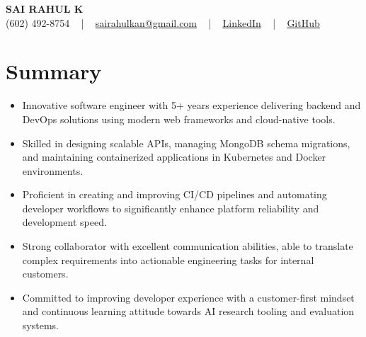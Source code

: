 \documentclass[letterpaper,11pt]{article}
\newcommand{\resumeItem}[1]{
  \item\footnotesize{
    {#1 \vspace{-2pt}}
  }
}
\newcommand{\resumeItemListStart}{\begin{itemize}[leftmargin=*]}
\newcommand{\resumeItemListEnd}{\end{itemize}\vspace{-5pt}}
\begin{document}
\begin{center}
    {\fontsize{14pt}{12pt}\selectfont \textbf{\MakeUppercase{Sai Rahul K}}}\\ \vspace{2pt}
    \fontsize{10pt}{12pt}\selectfont (602) 492-8754 ~ | ~ \href{mailto:sairahulkan@gmail.com}{sairahulkan@gmail.com} ~ | ~
    \href{https://www.linkedin.com/in/rq123/}{\color{blue}\underline{LinkedIn}} ~ | ~
    \href{https://github.com/kanrahuldo}{\color{blue}\underline{GitHub}}~
    \vspace{-8pt}
\end{center}

\section{Summary}
\fontsize{9pt}{10pt}\selectfont
\resumeItemListStart
    \resumeItem{Innovative software engineer with 5+ years experience delivering backend and DevOps solutions using modern web frameworks and cloud-native tools.}
    \resumeItem{Skilled in designing scalable APIs, managing MongoDB schema migrations, and maintaining containerized applications in Kubernetes and Docker environments.}
    \resumeItem{Proficient in creating and improving CI/CD pipelines and automating developer workflows to significantly enhance platform reliability and development speed.}
    \resumeItem{Strong collaborator with excellent communication abilities, able to translate complex requirements into actionable engineering tasks for internal customers.}
    \resumeItem{Committed to improving developer experience with a customer-first mindset and continuous learning attitude towards AI research tooling and evaluation systems.}
\resumeItemListEnd
\vspace{-6pt}
\end{document}
